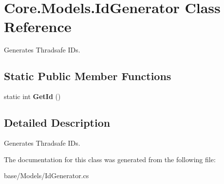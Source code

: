 \hypertarget{classCore_1_1Models_1_1IdGenerator}{\section{Core.\-Models.\-Id\-Generator Class Reference}
\label{classCore_1_1Models_1_1IdGenerator}
}


Generates Thradsafe I\-Ds.  


\subsection*{Static Public Member Functions}
\begin{DoxyCompactItemize}
\item 
\hypertarget{classCore_1_1Models_1_1IdGenerator_a8b53e1828e49d7b8e40a4d61f0083ef2}{static int {\bfseries Get\-Id} ()}\label{classCore_1_1Models_1_1IdGenerator_a8b53e1828e49d7b8e40a4d61f0083ef2}

\end{DoxyCompactItemize}


\subsection{Detailed Description}
Generates Thradsafe I\-Ds. 



The documentation for this class was generated from the following file\-:\begin{DoxyCompactItemize}
\item 
base/\-Models/Id\-Generator.\-cs\end{DoxyCompactItemize}
